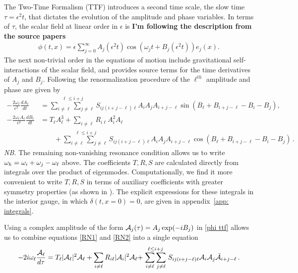 \documentclass[../PhD.tex]{subfiles}
\begin{document}
The Two-Time Formalism (TTF) introduces a second time scale, the slow time $\tau = \epsilon^2 t$, that dictates the evolution of the amplitude and phase variables. In terms of $\tau$, the scalar field at linear order in $\epsilon$ is {\bf I'm following the description from the source papers}
\begin{align}
\label{phi ttf}
\phi(t,x) = \epsilon \sum_{j=0}^\infty A_j (\epsilon^2 t) \cos \left(\omega_j t + B_j(\epsilon^2 t) \right) e_j(x) .
\end{align}
The next non-trivial order in the equations of motion include gravitational self-interactions of the scalar field, and provides source terms for the time derivatives of $A_j$ and $B_j$. Following the renormalization procedure of \cite{1407.6273} the $\ell^{th}$ amplitude and phase are given by
\begin{align}
\label{RN1}
-\frac{2\omega_\ell}{\epsilon^2} \frac{d A_\ell}{d t} &= \stackrel{\ell \leq i + j}{\sum_{i \neq \ell} \sum_{j \neq \ell}} S_{ij (i + j -\ell) \ell} A_i A_j A_{i + j - \ell} \sin \left( B_\ell + B_{i+j-\ell} - B_i - B_j \right) , \\
\label{RN2}
- \frac{2 \omega_\ell A_\ell}{\epsilon^2} \frac{d B_\ell}{dt} &= T_\ell A_\ell^3 + \sum_{i \neq \ell} R_{i \ell} A^2_i A_\ell  \nonumber \\
& \qquad + \stackrel{\ell \leq i + j}{\sum_{i \neq \ell} \sum_{j \neq \ell}} S_{ij (i + j -\ell) \ell} A_i A_j A_{i + j - \ell} \cos \left( B_\ell + B_{i+j-\ell} - B_i - B_j \right) \, .
\end{align}
{\it NB.} The remaining non-vanishing resonance condition allows us to write $\omega_k = \omega_i + \omega_j - \omega_\ell$ above. The coefficients $T, R, S$ are calculated directly from integrals over the product of eigenmodes. Computationally, we find it more convenient to write $T, R, S$ in terms of auxiliary coefficients with greater symmetry properties (as shown in \cite{1508.04943}). The explicit expressions for these integrals in the interior gauge, in which $\delta(t,x=0)=0$, are given in appendix~\ref{app: integrals}. 

Using a complex amplitude of the form $\mathcal A_j(\tau) = A_j \exp (-i B_j )$ in \eqref{phi ttf} allows us to combine equations \eqref{RN1} and \eqref{RN2} into a single equation
\begin{align}
\label{ttf eqn}
-2i \omega_\ell \frac{\mathcal A_\ell}{d \tau} = T_\ell |\mathcal A_\ell|^2 \mathcal A_\ell + \sum_{i \neq \ell} R_{i\ell} |\mathcal A_i|^2 \mathcal A_\ell + \stackrel{\ell \leq i+j}{\sum_{i \neq \ell} \sum_{j \neq \ell}} S_{ij(i+j-\ell)\ell} \mathcal A_i \mathcal A_j \bar{\mathcal A}_{i+j-\ell} \, .
\end{align}
\end{document}
